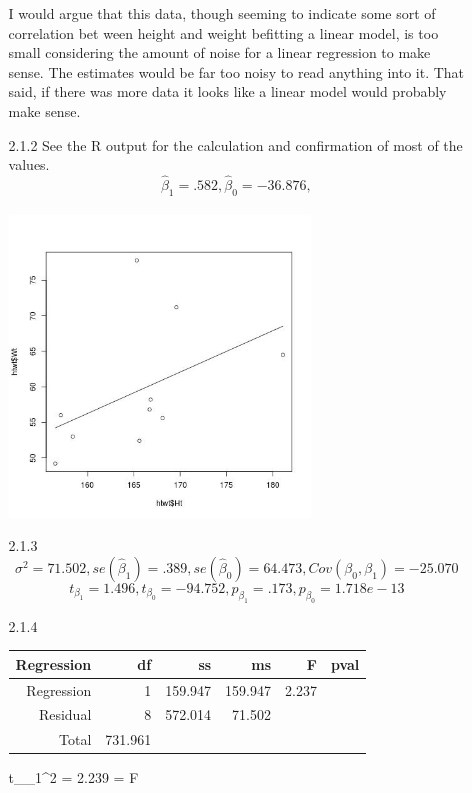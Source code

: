 \documentclass[11pt]{article}
\theoremstyle{definition}
\begin{document}
\begin{enumerate}
\begin{enumerate}
                I would argue that this data, though seeming to indicate some sort of correlation bet ween height and weight befitting a linear model, is too small considering the amount of noise for a linear regression to make sense. The estimates would be far too noisy to read anything into it. That said, if there was more data it looks like a linear model would probably make sense.
            \item[2.1.2]
                See the R output for the calculation and confirmation of most of the values. 
                \[ \hat{\beta}_1=.582, \hat{\beta}_0=-36.876, \]
                \\ \includegraphics[width=8cm]{hw1_2_1_2} \\ 
            \item[2.1.3]
            \[\sigma^2=71.502, se(\hat{\beta}_1)=.389, se(\hat{\beta}_0)=64.473, Cov(\beta_0,\beta_1)=-25.070 \] 
            \[t_{\beta_1} = 1.496, t_{\beta_0}=-94.752, p_{\beta_1} = .173, p_{\beta_0} = 1.718e-13 \]
            \item[2.1.4]
                \begin{center}
                    \begin{tabular}{r | r r r r r}
                        Regression & df      & ss      & ms      & F     & pval \\
                        \hline
                        Regression & 1       & 159.947 & 159.947 & 2.237 & \approx 0 \\
                        Residual   & 8       & 572.014 & 71.502  &       &  \\
                        Total      & 731.961 &         &         &       & 
                    \end{tabular}
                \end{center}
                t_{\beta_1}^2 = 2.239 = F
        \end{enumerate}
        

\end{enumerate}
\end{document}
